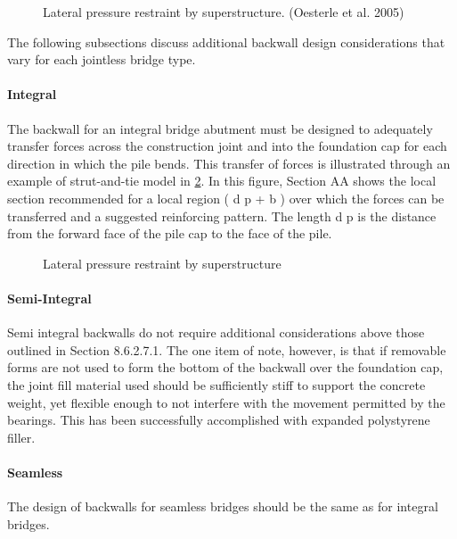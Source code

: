 \begin{figure}
  \caption{Lateral pressure restraint by superstructure. (Oesterle et al. 2005)}
  \label{fig:lateral-pressure-superstructure}
\end{figure}

The following subsections discuss additional backwall design considerations that vary for each jointless bridge type.

\paragraph{Integral}

The backwall for an integral bridge abutment must be designed to adequately transfer forces across the construction joint and into the foundation cap for each direction in which the pile bends. This transfer of forces is illustrated through an example of strut-and-tie model in \cref{fig:lateral-pressure}. In this figure, Section AA shows the local section recommended for a local region ( d p + b ) over which the forces can be transferred and a suggested reinforcing pattern. The length d p is the distance from the forward face of the pile cap to the face of the pile.

\begin{figure}
  \caption{Lateral pressure restraint by superstructure}
  \label{fig:lateral-pressure}
\end{figure}

\paragraph{Semi-Integral}

Semi integral backwalls do not require additional considerations above those outlined in Section 8.6.2.7.1. The one item of note, however, is that if removable forms are not used to form the bottom of the backwall over the foundation cap, the joint fill material used should be sufficiently stiff to support the concrete weight, yet flexible enough to not interfere with the movement permitted by the bearings. This has been successfully accomplished with expanded polystyrene filler.

\paragraph{Seamless}
The design of backwalls for seamless bridges should be the same as for integral bridges.


